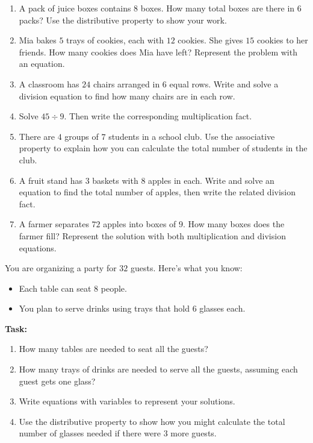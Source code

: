 \documentclass[12pt]{article}
\begin{document}
\begin{tcolorbox}[colframe=black!60, colback=white, 
coltitle=black, colbacktitle=black!15, fonttitle=\bfseries\Large, 
title=Problems, halign title=center, left=10pt, right=10pt, top=10pt, bottom=60pt]
\begin{enumerate}[start=9, itemsep=3em]
    \item A pack of juice boxes contains \(8\) boxes. How many total boxes are there in \(6\) packs? Use the distributive property to show your work.
    \item Mia bakes \(5\) trays of cookies, each with \(12\) cookies. She gives \(15\) cookies to her friends. How many cookies does Mia have left? Represent the problem with an equation.
    \item A classroom has \(24\) chairs arranged in \(6\) equal rows. Write and solve a division equation to find how many chairs are in each row.
    \item Solve \(45 \div 9\). Then write the corresponding multiplication fact.
    \item There are \(4\) groups of \(7\) students in a school club. Use the associative property to explain how you can calculate the total number of students in the club.
    \item A fruit stand has \(3\) baskets with \(8\) apples in each. Write and solve an equation to find the total number of apples, then write the related division fact.
    \item A farmer separates \(72\) apples into boxes of \(9\). How many boxes does the farmer fill? Represent the solution with both multiplication and division equations.
\end{enumerate}
\end{tcolorbox}

\vspace{1em}

\begin{tcolorbox}[colframe=black!60, colback=white, 
coltitle=black, colbacktitle=black!15, fonttitle=\bfseries\Large, 
title=Performance Task: Planning a Party, halign title=center, left=10pt, right=10pt, top=10pt, bottom=50pt]
You are organizing a party for \(32\) guests. Here’s what you know:
\begin{itemize}
    \item Each table can seat \(8\) people.
    \item You plan to serve drinks using trays that hold \(6\) glasses each.
\end{itemize}
\textbf{Task:}
\begin{enumerate}[itemsep=3em]
    \item How many tables are needed to seat all the guests?
    \item How many trays of drinks are needed to serve all the guests, assuming each guest gets one glass?
    \item Write equations with variables to represent your solutions.
    \item Use the distributive property to show how you might calculate the total number of glasses needed if there were \(3\) more guests.
\end{enumerate}
\end{tcolorbox}
\end{document}
